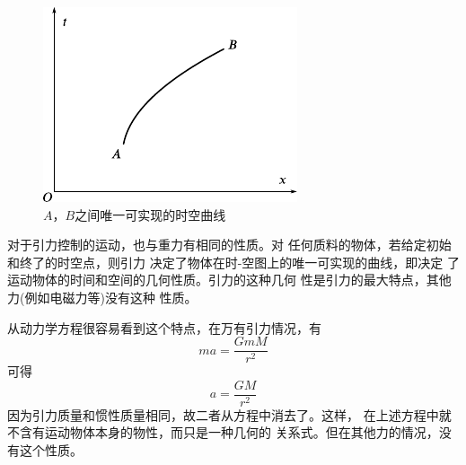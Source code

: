 \begin{figure}
  \centering
  \includegraphics{figure/fig04.08}
  \caption{$ A $，$ B $之间唯一可实现的时空曲线}
  \label{fig:04.08}
\end{figure}
对于引力控制的运动，也与重力有相同的性质。对
任何质料的物体，若给定初始和终了的时空点，则引力
决定了物体在时-空图上的唯一可实现的曲线，即决定
了运动物体的时间和空间的几何性质。引力的这种几何
性是引力的最大特点，其他力(例如电磁力等)没有这种
性质。

从动力学方程很容易看到这个特点，在万有引力情况，有
\begin{equation*}
  m a = \frac { G m M } { r ^ { 2 } }
\end{equation*}
可得\vspace{-1em}
\begin{equation*}
  a = \frac { G M } { r ^ { 2 } }
\end{equation*}
因为引力质量和惯性质量相同，故二者从方程中消去了。这样，
\clearpage\noindent
在上述方程中就不含有运动物体本身的物性，而只是一种几何的
关系式。但在其他力的情况，没有这个性质。